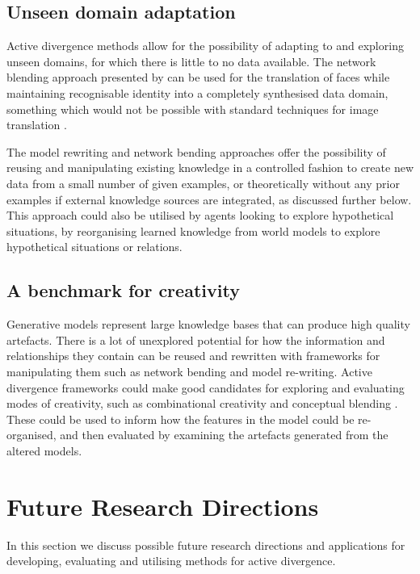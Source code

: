 \subsection{Unseen domain adaptation}

Active divergence methods allow for the possibility of adapting to and exploring unseen domains, for which there is little to no data available. The network blending approach presented by \citet{pinkney2020interpolation} can be used for the translation of faces while maintaining recognisable identity into a completely synthesised data domain, something which would not be possible with standard techniques for image translation \citep{zhu2017unpaired}.

The model rewriting and network bending approaches offer the possibility of reusing and manipulating existing knowledge in a controlled fashion to create new data from a small number of given examples, or theoretically without any prior examples if external knowledge sources are integrated, as discussed further below. This approach could also be utilised by agents looking to explore hypothetical situations, by reorganising learned knowledge from world models \citep{ha2018worldmodels} to explore hypothetical situations or relations. 


\subsection{A benchmark for creativity}

Generative models represent large knowledge bases that can produce high quality artefacts. There is a lot of unexplored potential for how the information and relationships they contain can be reused and rewritten with frameworks for manipulating them such as network bending and model re-writing. Active divergence frameworks could make good candidates for exploring and evaluating modes of creativity, such as combinational creativity \citep{boden2004creative} and conceptual blending \citep{fauconnier2008way}. These could be used to inform how the features in the model could be re-organised, and then evaluated by examining the artefacts generated from the altered models. 

\section{Future Research Directions}


In this section we discuss possible future research directions and applications for developing, evaluating and utilising methods for active divergence.

